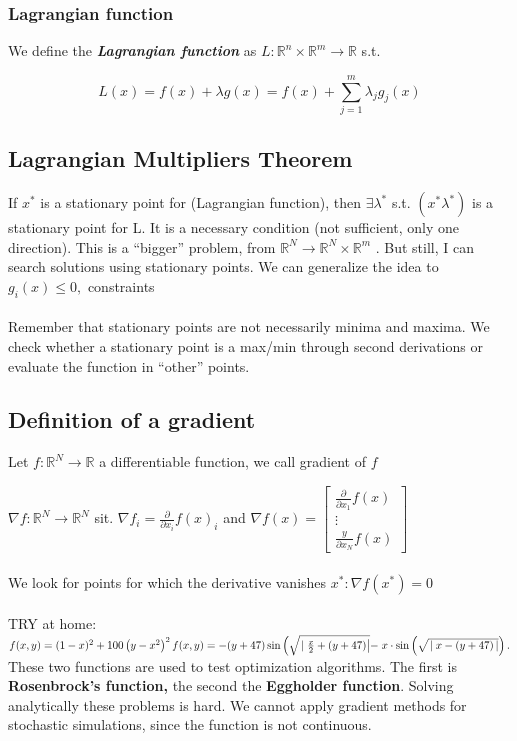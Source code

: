 \hypertarget{lagrangian-function}{%
\subsubsection{Lagrangian function}\label{lagrangian-function}}

We define the \textbf{\emph{Lagrangian function}} as
$L: \mathbb{R}^n \times \mathbb{R}^m \rightarrow \mathbb{R}$ s.t.

$$
L(x)= f(x) + \lambda g(x) = f(x) + \sum_{j=1}^m \lambda_j g_j(x)
$$

\hypertarget{lagrangian-multipliers-theorem}{%
\subsection{Lagrangian Multipliers
Theorem}\label{lagrangian-multipliers-theorem}}

If $x^*$ is a stationary point for (Lagrangian function), then
$\exists \lambda^*$ s.t. $(x^* \lambda^*)$ is a stationary point for L. It
is a necessary condition (not sufficient, only one direction). This is a ``bigger'' problem, from
$\mathbb{R}^N \rightarrow \mathbb{R}^N \times \mathbb{R}^m$ . But still,
I can search solutions using stationary points. We can generalize the
idea to $g_i(x) \leq 0,$ constraints
\\
\\
\noindent
Remember that stationary points are not necessarily minima and maxima.
We check whether a stationary point is a max/min through second
derivations or evaluate the function in ``other'' points.

\subsection{Definition of a gradient}

Let $f: \mathbb{R}^N \rightarrow \mathbb{R}$ a differentiable function, we call gradient of $f$

$\nabla f: \mathbb{R}^N \rightarrow \mathbb{R}^N$ sit.
$\nabla f_i=\frac{\partial}{\partial x_i} f(x)_i$ and
$\nabla f(x) =\left[\begin{array}{c}\frac{\partial}{\partial x_1} f(x) \\ \vdots \\ \frac{y}{\partial x_N} f(x)\end{array}\right]$
\\
\\
\noindent
We look for points for which the derivative vanishes
$x^* : \nabla f(x^*)=0$
\\
\\
\noindent
TRY at home:$f(x, y)=(1-x)^2+100\left(y-x^2\right)^2 \\ f(x, y)=-(y+47) \sin \left(\sqrt{\left.\mid \frac{x}{2}+(y+47)\right|}-\right. x \cdot \sin \left(\sqrt{\left.\mid x-(y+47\right)|}\right).$
\noindent
These two functions are used to test optimization algorithms. The first
is \textbf{Rosenbrock's function,} the second the \textbf{Eggholder
function}. Solving analytically these problems is hard. We cannot apply gradient methods for stochastic simulations, since the
function is not continuous.


